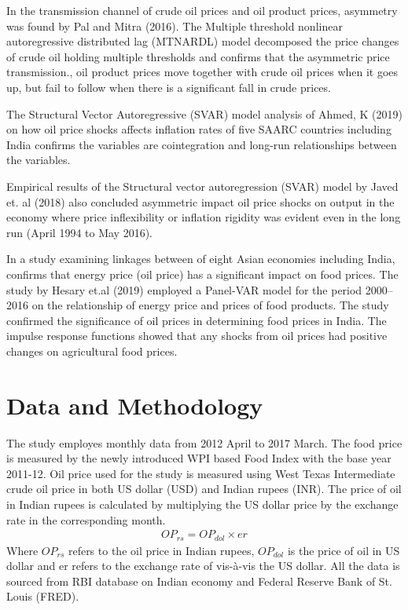 \documentclass[a4paper,12pt]{article}
\begin{document}
In the transmission channel of crude oil prices and oil product prices, asymmetry was found by Pal and Mitra (2016). The Multiple threshold nonlinear autoregressive distributed lag (MTNARDL) model decomposed the price changes of crude oil holding multiple thresholds and confirms that the asymmetric price transmission., oil product prices move together with crude oil prices when it goes up, but fail to follow when there is a significant fall in crude prices.

The Structural Vector Autoregressive (SVAR) model analysis of Ahmed, K (2019) on how oil price shocks affects inflation rates of five SAARC countries including India confirms the variables are cointegration and long-run relationships between the variables.

Empirical results of the Structural vector autoregression (SVAR) model by Javed et. al (2018) also concluded asymmetric impact oil price shocks on output in the economy where price inflexibility or inflation rigidity was evident even in the long run (April 1994 to May 2016).   

In a study examining linkages between of eight Asian economies including India, confirms that energy price (oil price) has a significant impact on food prices. 
The study by Hesary et.al (2019) employed a Panel-VAR model for the period 2000–2016 on the relationship of energy price and prices of food products.
The study confirmed the significance of oil prices in determining food prices in India.  The impulse response functions showed that any shocks from oil prices had positive changes on agricultural food prices.

\section{Data and Methodology}
The study employes monthly data from 2012 April to 2017 March. The food price is measured by the newly introduced WPI based Food Index with the base year 2011-12. Oil price used for the study is measured using West Texas Intermediate crude oil price in both US dollar (USD) and Indian rupees (INR). The price of oil in Indian rupees is calculated by multiplying the US dollar price by the exchange rate in the corresponding month. 
\begin{align*}
	OP_{rs}=OP_{dol} \times er
\end{align*}
Where $OP_{rs}$ refers to the oil price in Indian rupees, $ OP_{dol} $ is the price of oil in US dollar and er refers to the exchange rate of vis-à-vis the US dollar. All the data is sourced from RBI database on Indian economy and Federal Reserve Bank of St. Louis (FRED). 
\end{document}
